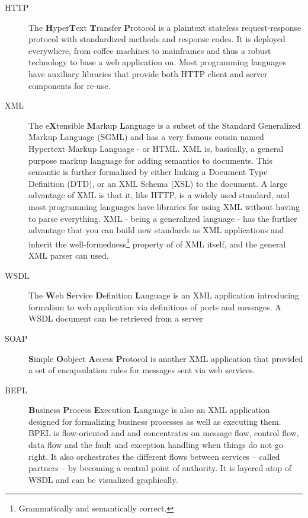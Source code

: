 \begin{description}
\item[HTTP] The \textbf{H}yper\textbf{T}ext \textbf{T}ransfer \textbf{P}rotocol is a plaintext stateless request-response protocol with standardized methods and response codes. It is deployed everywhere, from coffee machines to mainframes and thus a robust technology to base a web application on. Most programming languages have auxiliary libraries that provide both HTTP client and server components for re-use.

\item[XML] The e\textbf{X}tensible \textbf{M}arkup \textbf{L}anguage is a subset of the Standard Generalized Markup Language (SGML) and has a very famous cousin named Hypertext Markup Language - or HTML. XML is, basically, a general purpose markup language for adding semantics to documents. This semantic is further formalized by either linking a Document Type Definition (DTD), or an XML Schema (XSL) to the document. A large advantage of XML is that it, like HTTP, is a widely used standard, and most programming languages have libraries for using XML without having to parse everything. XML - being a generalized language - has the further advantage that you can build new standards as XML applications and inherit the well-formedness\footnote{Grammatically and semantically correct.} property of of XML itself, and the general XML parser can used.

\item[WSDL] The \textbf{W}eb \textbf{S}ervice \textbf{D}efinition \textbf{L}anguage is an XML application introducing formalism to web application via definitions of ports and messages. A WSDL document can be retrieved from a server

\item[SOAP] \textbf{S}imple \textbf{O}object \textbf{A}ccess \textbf{P}rotocol is another XML application that provided a  set of encapsulation rules for messages sent via web services.

\item[BEPL] \textbf{B}usiness \textbf{P}rocess \textbf{E}xecution \textbf{L}anguage is also an XML application designed for formalizing business processes as well as executing them. BPEL is flow-oriented and and concentrates on message flow, control flow, data flow and the fault and exception handling when things do not go right. It also orchestrates the different flows between services -- called partners -- by becoming a central point of authority. It is layered atop of WSDL and can be visualized graphically.


\end{description}
